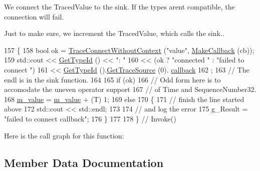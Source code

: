 We connect the Traced\+Value to the sink. If the types aren\textquotesingle{}t compatible, the connection will fail.

Just to make sure, we increment the Traced\+Value, which calls the sink.. 
\begin{DoxyCode}
157     \{
158       \textcolor{keywordtype}{bool} ok = \hyperlink{classns3_1_1ObjectBase_a1be45f6fd561e75dcac9dfa81b2b81e4}{TraceConnectWithoutContext} (\textcolor{stringliteral}{"value"}, 
      \hyperlink{group__makecallbackmemptr_ga9376283685aa99d204048d6a4b7610a4}{MakeCallback} (cb));
159       std::cout << \hyperlink{classTracedValueCallbackTestCase_1_1CheckTvCb_a235097b2a2fa320df1be86bb6f203fa3}{GetTypeId} () << \textcolor{stringliteral}{": "}
160                 << (ok ? \textcolor{stringliteral}{"connected "} : \textcolor{stringliteral}{"failed to connect "})
161                 << \hyperlink{classTracedValueCallbackTestCase_1_1CheckTvCb_a235097b2a2fa320df1be86bb6f203fa3}{GetTypeId} ().\hyperlink{classns3_1_1TypeId_ace6eba2cb63ba49c2810d22c21818884}{GetTraceSource} (0).
      \hyperlink{structns3_1_1TypeId_1_1TraceSourceInformation_ab88a91bae633604934a607053b1692ef}{callback}
162         ;
163       \textcolor{comment}{// The endl is in the sink function.}
164       
165       \textcolor{keywordflow}{if} (ok)
166         \textcolor{comment}{// Odd form here is to accomodate the uneven operator support}
167         \textcolor{comment}{// of Time and SequenceNumber32.}
168         \hyperlink{classTracedValueCallbackTestCase_1_1CheckTvCb_af7cf27a79d15c631a58b9838ee664f3f}{m\_value} = \hyperlink{classTracedValueCallbackTestCase_1_1CheckTvCb_af7cf27a79d15c631a58b9838ee664f3f}{m\_value} + (T) 1; 
169       \textcolor{keywordflow}{else}
170         \{
171           \textcolor{comment}{// finish the line started above}
172           std::cout << std::endl;
173 
174           \textcolor{comment}{// and log the error}
175           g\_Result = \textcolor{stringliteral}{"failed to connect callback"};
176         \}
177 
178     \}  \textcolor{comment}{// Invoke()}
\end{DoxyCode}


Here is the call graph for this function\+:




\subsection{Member Data Documentation}
